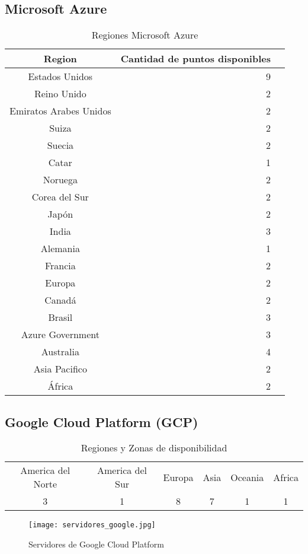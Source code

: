 \documentclass{article}
\begin{document}
\newpage

  \subsection{Microsoft Azure}

  \begin{table}[!htp]\centering
\caption{Regiones Microsoft Azure}\label{tab:azure_regions}
\scriptsize
\begin{tabular}{lrrr}\toprule
\multicolumn{2}{c}{Region} &Cantidad de puntos disponibles \\\midrule
\multicolumn{2}{c}{Estados Unidos} &9 \\
\multicolumn{2}{c}{Reino Unido} &2 \\
\multicolumn{2}{c}{Emiratos Arabes Unidos} &2 \\
\multicolumn{2}{c}{Suiza} &2 \\
\multicolumn{2}{c}{Suecia} &2 \\
\multicolumn{2}{c}{Catar} &1 \\
\multicolumn{2}{c}{Noruega} &2 \\
\multicolumn{2}{c}{Corea del Sur} &2 \\
\multicolumn{2}{c}{Japón} &2 \\
\multicolumn{2}{c}{India} &3 \\
\multicolumn{2}{c}{Alemania} &1 \\
\multicolumn{2}{c}{Francia} &2 \\
\multicolumn{2}{c}{Europa} &2 \\
\multicolumn{2}{c}{Canadá} &2 \\
\multicolumn{2}{c}{Brasil} &3 \\
\multicolumn{2}{c}{Azure Government} &3 \\
\multicolumn{2}{c}{Australia} &4 \\
\multicolumn{2}{c}{Asia Pacifico} &2 \\
\multicolumn{2}{c}{África} &2 \\
\bottomrule
\end{tabular}
\end{table}


  \subsection{Google Cloud Platform (GCP)}

\begin{table}[!htp]\centering
  \caption{Regiones y Zonas de disponibilidad\cite{google_regions}}
  \label{tab:regiones}
  \begin{tabular}{|c|c|c|c|c|c|}
    \toprule
    America del Norte & America del Sur & Europa & Asia & Oceania & Africa \\
    3 & 1 & 8 & 7 & 1 & 1 \\
    \bottomrule
  \end{tabular}
\end{table}
 \begin{figure}[!htp]
  \centering
  \texttt{[image: servidores\_google.jpg]}
  \caption{Servidores de Google Cloud Platform}
  \label{fig:servidores_google}
  \end{figure}
\end{document}
